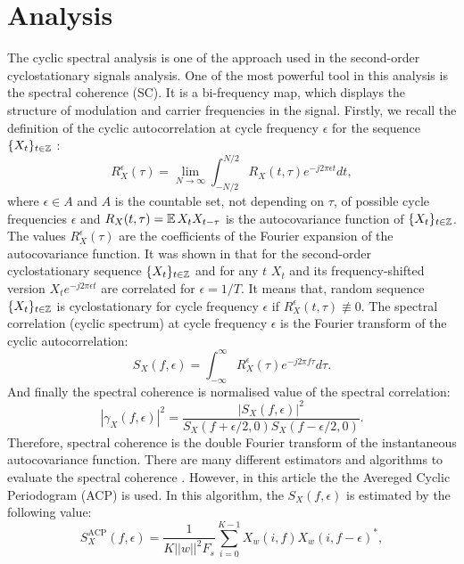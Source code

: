 \section{Analysis}
The cyclic spectral analysis is one of the approach used in the second-order cyclostationary signals analysis.  One of the most powerful tool in this analysis is the  spectral coherence (SC). It is a bi-frequency map, which displays the structure of modulation and carrier frequencies in the signal. 
Firstly, we recall the definition of the cyclic autocorrelation at cycle frequency $\epsilon$ for the sequence $\{X_t\}_{t\in \mathbb{Z}}$ \cite{gardner1991exploitation}:
\begin{equation}
    R_X^{\epsilon}(\tau)=\lim_{N\to\infty} \int_{-N/2}^{N/2}R_X(t,\tau)e^{-j2\pi\epsilon t}dt,
\end{equation}
where $\epsilon \in A$ and $A$ is the countable set, not depending on $\tau$, of possible cycle frequencies $\epsilon$ and  $R_X(t,\tau)=\operatorname{\mathbb{E}} X_tX_{t-\tau}$ is the autocovariance function of $\{X_t\}_{t\in \mathbb{Z}}$. The values  $R_X^{\epsilon}(\tau)$ are the coefficients of the Fourier expansion of the autocovariance function. 
It was shown in \cite{gardner1978stationarizable} that for  the second-order cyclostationary sequence $\{X_t\}_{t\in \mathbb{Z}}$ and for any $t$  $X_t$ and its frequency-shifted version $X_te^{-j2\pi\epsilon t}$ are correlated  for $\epsilon=1/T$.  It means that, random sequence $\{X_t\}_{t\in \mathbb{Z}}$ is cyclostationary for cycle frequency $\epsilon$ if $R_X^{\epsilon}(t,\tau)\not\equiv 0$. 
The spectral correlation (cyclic spectrum) at cycle frequency $\epsilon$ is the Fourier transform of the cyclic autocorrelation:
\begin{equation}
    S_X(f,\epsilon)=\int_{-\infty}^{\infty}R_X^{\epsilon}(\tau)e^{-j2\pi f \tau} d\tau.
\end{equation}
And finally the spectral coherence is normalised value of the spectral correlation: 
\begin{equation}
\label{eq:SC}
\left|\gamma_X(f,\epsilon)\right|^{2}=\frac{ \left|S_X(f,\epsilon)\right|^2}{ S_X(f+\epsilon/2,0)S_X(f-\epsilon/2,0)}.
\end{equation}
Therefore, spectral coherence is the double Fourier transform of the instantaneous autocovariance function.
There are many different estimators and algorithms to evaluate the spectral coherence \cite{roberts1991computationally,spooner1994cumulant}. However, in this article the the Avereged Cyclic Periodogram (ACP) \cite{antoni2007cyclic2} is used. In this algorithm, the $S_X(f,\epsilon)$ is estimated by the following value:
\begin{equation}
    S_X^{\textrm{ACP}}(f,\epsilon)=\frac{1}{K||w||^2F_s}\sum_{i=0}^{K-1}X_w(i,f)X_w(i,f-\epsilon)^*,
\end{equation}
